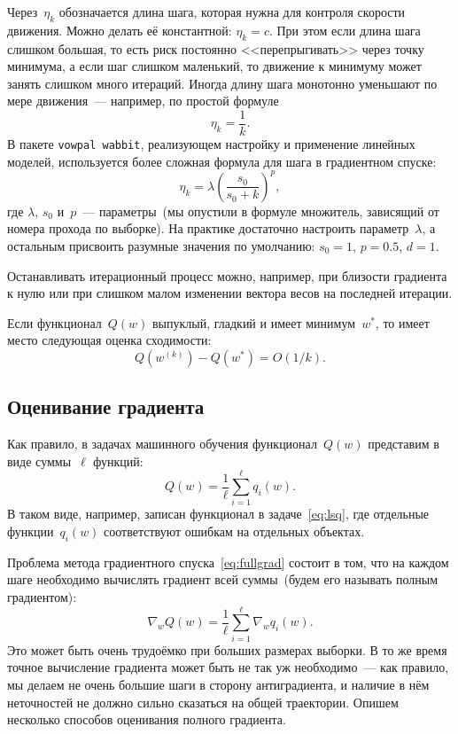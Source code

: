 \documentclass[12pt,fleqn]{article}
\begin{document}
Через~$\eta_k$ обозначается длина шага, которая нужна для контроля скорости движения.
Можно делать её константной: $\eta_k = c$.
При этом если длина шага слишком большая, то есть риск постоянно <<перепрыгивать>> через точку минимума,
а если шаг слишком маленький, то движение к минимуму может занять слишком много итераций.
Иногда длину шага монотонно уменьшают по мере движения~--- например, по простой формуле
\[
    \eta_k
    =
    \frac{1}{k}.
\]
В пакете \texttt{vowpal wabbit}, реализующем настройку и применение линейных моделей,
используется более сложная формула для шага в градиентном спуске:
\[
    \eta_k
    =
    \lambda
    \left(
        \frac{s_0}{s_0 + k}
    \right)^p,
\]
где $\lambda$, $s_0$ и~$p$~--- параметры~(мы опустили в формуле множитель, зависящий от номера прохода по выборке).
На практике достаточно настроить параметр~$\lambda$, а остальным
присвоить разумные значения по умолчанию: $s_0 = 1$, $p = 0.5$, $d = 1$.

Останавливать итерационный процесс можно, например, при близости градиента к нулю
или при слишком малом изменении вектора весов на последней итерации.

Если функционал~$Q(w)$ выпуклый, гладкий и имеет минимум~$w^*$,
то имеет место следующая оценка сходимости:
\[
    Q(w^{(k)}) - Q(w^*)
    =
    O(1 / k).
\]

\subsection{Оценивание градиента}

Как правило, в задачах машинного обучения функционал~$Q(w)$ представим в виде суммы~$\ell$ функций:
\[
    Q(w)
    =
    \frac{1}{\ell}
    \sum_{i = 1}^{\ell}
        q_i(w).
\]
В таком виде, например, записан функционал в задаче~\eqref{eq:lsq},
где отдельные функции~$q_i(w)$ соответствуют ошибкам на отдельных объектах.

Проблема метода градиентного спуска~\eqref{eq:fullgrad} состоит в том,
что на каждом шаге необходимо вычислять градиент всей суммы~(будем его называть полным градиентом):
\[
    \nabla_w Q(w)
    =
    \frac{1}{\ell}
    \sum_{i = 1}^{\ell}
        \nabla_w q_i(w).
\]
Это может быть очень трудоёмко при больших размерах выборки.
В то же время точное вычисление градиента может быть не так уж необходимо~---
как правило, мы делаем не очень большие шаги в сторону антиградиента,
и наличие в нём неточностей не должно сильно сказаться на общей траектории.
Опишем несколько способов оценивания полного градиента.
\end{document}
